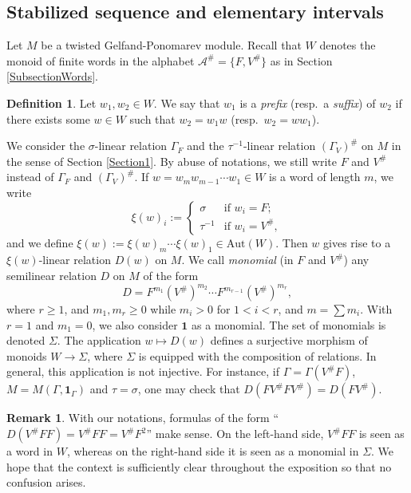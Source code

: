 \documentclass[12pt]{amsart}
\theoremstyle{definition}
\newtheorem{definition}[theorem]{Definition}
\newtheorem{remark}[theorem]{Remark}
\newcommand{\<}{\langle}   %
\renewcommand{\>}{\rangle} %
\begin{document}
\subsection{Stabilized sequence and elementary intervals}

Let $M$ be a twisted Gelfand-Ponomarev module. Recall that $W$ denotes the monoid of finite words in the alphabet $\mathcal A^{\#} = \{F,V^{\#}\}$ as in Section \ref{SubsectionWords}.

\begin{definition}
    Let $w_1,w_2 \in W$. We say that $w_1$ is a \textit{prefix} (resp.~a \textit{suffix}) of $w_2$ if there exists some $w \in W$ such that $w_2 = w_1w$ (resp.~$w_2 = ww_1$).
\end{definition}

We consider the $\sigma$-linear relation $\Gamma_F$ and the $\tau^{-1}$-linear relation $(\Gamma_V)^{\#}$ on $M$ in the sense of Section \ref{Section1}. By abuse of notations, we still write $F$ and $V^{\#}$ instead of $\Gamma_F$ and $(\Gamma_V)^{\#}$. If $w = w_{m}w_{m-1} \cdots w_1 \in W$ is a word of length $m$, we write 
\begin{equation*}
    \xi(w)_i := \begin{cases}
        \sigma & \text{if } w_i = F;\\
        \tau^{-1} & \text{if } w_i = V^{\#},
    \end{cases}
\end{equation*} 
and we define $\xi(w) := \xi(w)_m \cdots \xi(w)_1 \in \mathrm{Aut}(W)$. Then $w$ gives rise to a $\xi(w)$-linear relation $D(w)$ on $M$. We call \textit{monomial} (in $F$ and $V^{\#}$) any semilinear relation $D$ on $M$ of the form 
\begin{equation*}
    D = F^{m_1}(V^{\#})^{m_2} \cdots F^{m_{r-1}}(V^{\#})^{m_r},
\end{equation*}
where $r \geq 1$, and $m_1,m_r \geq 0$ while $m_i > 0$ for $1 < i < r$, and $m = \sum m_i$. With $r=1$ and $m_1 = 0$, we also consider $\mathbf 1$ as a monomial. The set of monomials is denoted $\Sigma$. The application $w \mapsto D(w)$ defines a surjective morphism of monoids $W \to \Sigma$, where $\Sigma$ is equipped with the composition of relations. In general, this application is not injective. For instance, if $\Gamma = \Gamma(V^{\#}F)$, $M = M(\Gamma,\mathbf 1_{\Gamma})$ and $\tau = \sigma$, one may check that $D(FV^{\#}FV^{\#}) = D(FV^{\#})$.

\begin{remark}
    With our notations, formulas of the form ``$D(V^{\#}FF) = V^{\#}FF = V^{\#}F^2$'' make sense. On the left-hand side, $V^{\#}FF$ is seen as a word in $W$, whereas on the right-hand side it is seen as a monomial in $\Sigma$. We hope that the context is sufficiently clear throughout the exposition so that no confusion arises.
\end{remark}
\end{document}
